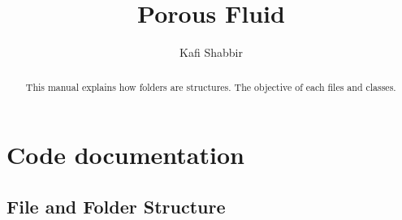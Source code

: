 \documentclass[
	12pt
] {article}
\author[1]{Kafi Shabbir}
\affil[1]{Moscow Institute of Physics and Technology}
\title{Porous Fluid}
\begin{document}
\maketitle
\renewcommand{\arraystretch}{1.4}

\begin{abstract}
	This manual explains how folders are structures. The objective of each files and classes.
\end{abstract}

\tableofcontents

\section{Code documentation}
\subsection{File and Folder Structure}
\end{document}
